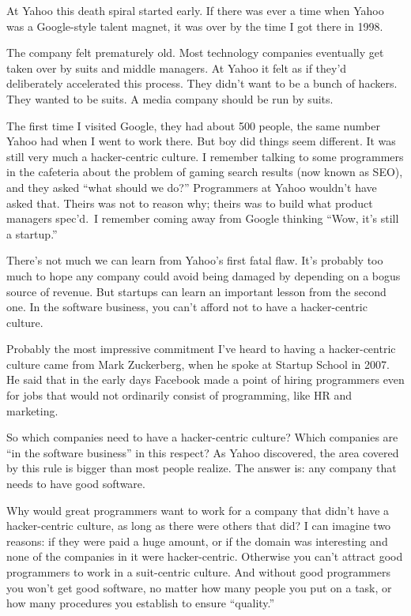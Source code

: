 \documentclass[12pt]{book}
\begin{document}
At Yahoo this death spiral started early. If there was ever a time when
Yahoo was a Google-style talent magnet, it was over by the time I got
there in 1998.

The company felt prematurely old. Most technology companies eventually
get taken over by suits and middle managers. At Yahoo it felt as if
they'd deliberately accelerated this process. They didn't want to be a
bunch of hackers. They wanted to be suits. A media company should be run
by suits.

The first time I visited Google, they had about 500 people, the same
number Yahoo had when I went to work there. But boy did things seem
different. It was still very much a hacker-centric culture. I remember
talking to some programmers in the cafeteria about the problem of gaming
search results (now known as SEO), and they asked ``what should we do?''
Programmers at Yahoo wouldn't have asked that. Theirs was not to reason
why; theirs was to build what product managers spec'd.~I remember coming
away from Google thinking ``Wow, it's still a startup.''

There's not much we can learn from Yahoo's first fatal flaw. It's
probably too much to hope any company could avoid being damaged by
depending on a bogus source of revenue. But startups can learn an
important lesson from the second one. In the software business, you
can't afford not to have a hacker-centric culture.

Probably the most impressive commitment I've heard to having a
hacker-centric culture came from Mark Zuckerberg, when he spoke at
Startup School in 2007. He said that in the early days Facebook made a
point of hiring programmers even for jobs that would not ordinarily
consist of programming, like HR and marketing.

So which companies need to have a hacker-centric culture? Which
companies are ``in the software business'' in this respect? As Yahoo
discovered, the area covered by this rule is bigger than most people
realize. The answer is: any company that needs to have good software.

Why would great programmers want to work for a company that didn't have
a hacker-centric culture, as long as there were others that did? I can
imagine two reasons: if they were paid a huge amount, or if the domain
was interesting and none of the companies in it were hacker-centric.
Otherwise you can't attract good programmers to work in a suit-centric
culture. And without good programmers you won't get good software, no
matter how many people you put on a task, or how many procedures you
establish to ensure ``quality.''
\end{document}
